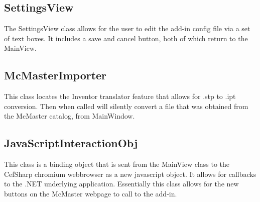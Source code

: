 \documentclass[12pt, letterpaper]{article}
\begin{document}
\subsection{SettingsView}
The SettingsView class allows for the user to edit the add-in config file via a set of text boxes. It includes a save and cancel button, both of which return to the MainView. 
\subsection{McMasterImporter}
This class locates the Inventor translator feature that allows for .stp to .ipt conversion. Then when called 
will silently convert a file that was obtained from the McMaster catalog, from MainWindow.
\subsection{JavaScriptInteractionObj}
This class is a binding object that is sent from the MainView class to the CefSharp chromium webbrowser as a new javascript object. It allows for callbacks to the .NET underlying application. Essentially 
this class allows for the new buttons on the McMaster webpage to call to the add-in.
\end{document}
